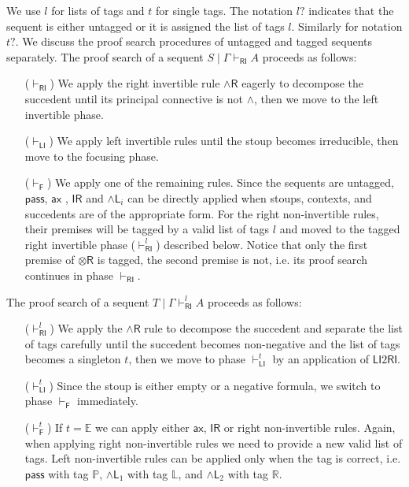 \documentclass[submission,copyright,creativecommons]{eptcs}
\theoremstyle{definition}
\newcommand{\tr}{\otimes \mathsf{R}}
\newcommand{\pass}{\mathsf{pass}}
\newcommand{\unitr}{\mathsf{IR}}
\newcommand{\andlone}{\land \mathsf{L}_{1}}
\newcommand{\andltwo}{\land \mathsf{L}_{2}}
\newcommand{\andli}{\land \mathsf{L}_{i}}
\newcommand{\andr}{\land \mathsf{R}}
\newcommand{\ax}{\mathsf{ax}}
\newcommand{\RI}{\mathsf{RI}}
\newcommand{\LI}{\mathsf{LI}}
\newcommand{\Pass}{\mathsf{P}}
\newcommand{\F}{\mathsf{F}}
\newcommand{\tP}{\mathbb{P}}
\newcommand{\tL}{\mathbb{L}}
\newcommand{\tR}{\mathbb{R}}
\newcommand{\tE}{\mathbb{E}}
\begin{document}
We use $l$ for lists of tags and $t$ for single tags.
The notation $l?$ indicates that the sequent is either untagged or it is assigned the list of tags $l$. Similarly for notation $t?$.
We discuss the proof search procedures of untagged and tagged sequents separately.
The proof search of a sequent $S \mid \Gamma \vdash_\RI A$ proceeds as follows:
\begin{itemize}
  \item[($\vdash_{\RI}$)] We apply the right invertible rule $\andr$ eagerly to decompose the succedent until its principal connective is not $\land$, then we move to the left invertible phase.
  \item[($\vdash_{\LI}$)] We apply left invertible rules until the stoup becomes irreducible, then move to the focusing phase.
  \item[($\vdash_{\F}$)] We apply one of the remaining rules. Since the sequents are untagged, $\pass$, $\ax$ , $\unitr$ and $\andli$ can be directly applied when stoups, contexts, and succedents are of the appropriate form.
  For the right non-invertible rules, their premises will be tagged by a valid list of tags $l$ and moved to the tagged right invertible phase ($\vdash^{l}_{\RI}$) described below. Notice that only the first premise of $\tr$ is tagged, the second premise is not, i.e. its proof search continues in phase $\vdash_{\RI}$.
\end{itemize}
The proof search of a sequent $T \mid \Gamma \vdash^{l}_\RI A$ proceeds as follows:
\begin{itemize}
  \item[($\vdash^{l}_{\RI}$)] We apply the $\andr$ rule to decompose the succedent and separate the list of tags carefully until the succedent becomes non-negative and the list of tags becomes a singleton $t$, then we move to phase $\vdash_\LI^t$ by an application of $\LI2 \RI$.
  \item[($\vdash^{t}_{\LI}$)] Since the stoup is either empty or a negative formula, we switch to phase $\vdash_\F$ immediately.
  \item[($\vdash^{t}_{\F}$)] If $t = \tE$ we can apply either $\ax$, $\unitr$ or right non-invertible rules. Again, when applying right non-invertible rules we need to provide a new valid list of tags.
  Left non-invertible rules can be applied only when the tag is correct, i.e. $\pass$ with tag $\tP$, $\andlone$ with tag $\tL$, and $\andltwo$ with tag $\tR$.
\end{itemize}
\end{document}
